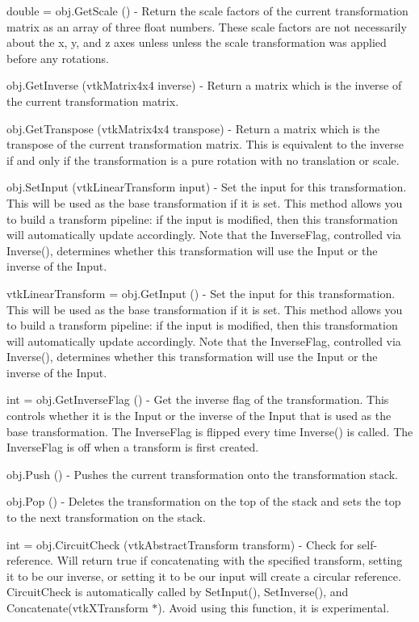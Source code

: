 \begin{DoxyItemize}
\item {\ttfamily double = obj.\-Get\-Scale ()} -\/ Return the scale factors of the current transformation matrix as an array of three float numbers. These scale factors are not necessarily about the x, y, and z axes unless unless the scale transformation was applied before any rotations.  
\item {\ttfamily obj.\-Get\-Inverse (vtk\-Matrix4x4 inverse)} -\/ Return a matrix which is the inverse of the current transformation matrix.  
\item {\ttfamily obj.\-Get\-Transpose (vtk\-Matrix4x4 transpose)} -\/ Return a matrix which is the transpose of the current transformation matrix. This is equivalent to the inverse if and only if the transformation is a pure rotation with no translation or scale.  
\item {\ttfamily obj.\-Set\-Input (vtk\-Linear\-Transform input)} -\/ Set the input for this transformation. This will be used as the base transformation if it is set. This method allows you to build a transform pipeline\-: if the input is modified, then this transformation will automatically update accordingly. Note that the Inverse\-Flag, controlled via Inverse(), determines whether this transformation will use the Input or the inverse of the Input.  
\item {\ttfamily vtk\-Linear\-Transform = obj.\-Get\-Input ()} -\/ Set the input for this transformation. This will be used as the base transformation if it is set. This method allows you to build a transform pipeline\-: if the input is modified, then this transformation will automatically update accordingly. Note that the Inverse\-Flag, controlled via Inverse(), determines whether this transformation will use the Input or the inverse of the Input.  
\item {\ttfamily int = obj.\-Get\-Inverse\-Flag ()} -\/ Get the inverse flag of the transformation. This controls whether it is the Input or the inverse of the Input that is used as the base transformation. The Inverse\-Flag is flipped every time Inverse() is called. The Inverse\-Flag is off when a transform is first created.  
\item {\ttfamily obj.\-Push ()} -\/ Pushes the current transformation onto the transformation stack.  
\item {\ttfamily obj.\-Pop ()} -\/ Deletes the transformation on the top of the stack and sets the top to the next transformation on the stack.  
\item {\ttfamily int = obj.\-Circuit\-Check (vtk\-Abstract\-Transform transform)} -\/ Check for self-\/reference. Will return true if concatenating with the specified transform, setting it to be our inverse, or setting it to be our input will create a circular reference. Circuit\-Check is automatically called by Set\-Input(), Set\-Inverse(), and Concatenate(vtk\-X\-Transform $\ast$). Avoid using this function, it is experimental.  

\end{DoxyItemize}

